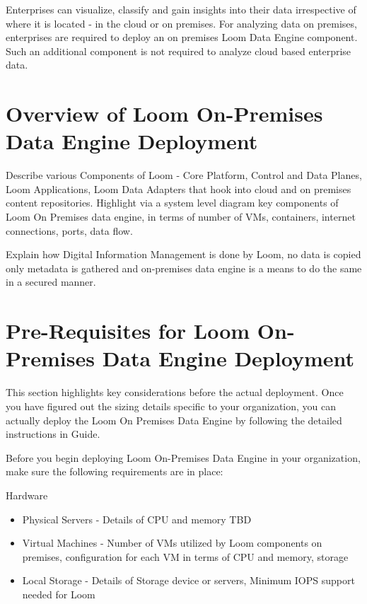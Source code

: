 \documentclass[letterpaper,10pt,english]{sphinxmanual}
\begin{document}
Enterprises can visualize, classify and gain insights into their data irrespective of where it is located - in the cloud or on premises.  For analyzing data on premises, enterprises are required to deploy an on premises Loom Data Engine component.  Such an additional component is not required to analyze cloud based enterprise data.


\section{Overview of Loom On-Premises Data Engine Deployment}
\label{\detokenize{loom_trbs_faq:overview-of-loom-on-premises-data-engine-deployment}}
Describe various Components of Loom  - Core Platform, Control and Data Planes, Loom Applications, Loom Data Adapters that hook into cloud and on premises content repositories. Highlight via a system level diagram key components of Loom On Premises data engine, in terms of number of VMs, containers, internet connections, ports, data flow.

Explain how Digital Information Management is done by Loom, no data is copied only metadata is gathered and on-premises data engine is a means to do the same in a secured manner.


\section{Pre-Requisites for Loom On-Premises Data Engine Deployment}
\label{\detokenize{loom_trbs_faq:pre-requisites-for-loom-on-premises-data-engine-deployment}}
This section highlights key considerations before the actual deployment.  Once you have figured out the sizing details specific to your organization, you can actually deploy the Loom On Premises Data Engine by following the detailed instructions in  Guide.

Before you begin deploying Loom On-Premises Data Engine in your organization, make sure the following requirements are in place:

Hardware
\begin{itemize}
\item {} 
Physical Servers - Details of CPU and memory TBD

\item {} 
Virtual Machines - Number of VMs utilized by Loom components on premises, configuration for each VM in terms of CPU and memory, storage

\item {} 
Local Storage  - Details of Storage device or servers, Minimum IOPS support needed for Loom

\end{itemize}
\end{document}
